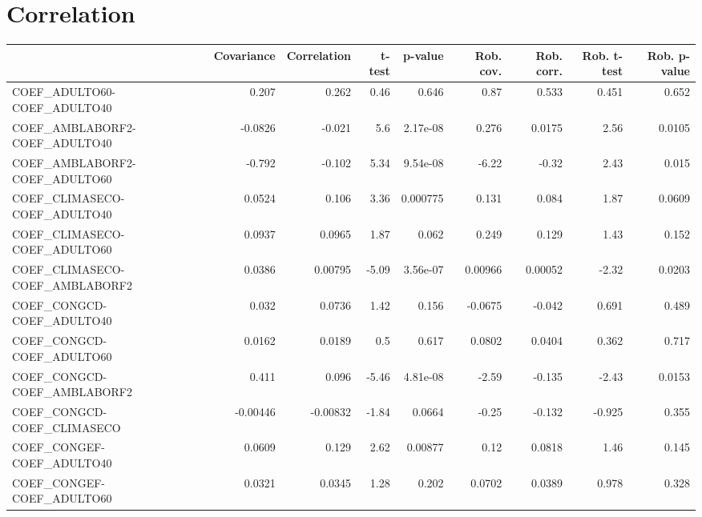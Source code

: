 \section{Correlation}
\begin{tabular}{lrrrrrrrr}
\toprule
{} &  Covariance &  Correlation &   t-test &  p-value &  Rob. cov. &  Rob. corr. &  Rob. t-test &  Rob. p-value \\
\midrule
COEF\_ADULTO60-COEF\_ADULTO40           &       0.207 &        0.262 &     0.46 &    0.646 &       0.87 &       0.533 &        0.451 &         0.652 \\
COEF\_AMBLABORF2-COEF\_ADULTO40         &     -0.0826 &       -0.021 &      5.6 & 2.17e-08 &      0.276 &      0.0175 &         2.56 &        0.0105 \\
COEF\_AMBLABORF2-COEF\_ADULTO60         &      -0.792 &       -0.102 &     5.34 & 9.54e-08 &      -6.22 &       -0.32 &         2.43 &         0.015 \\
COEF\_CLIMASECO-COEF\_ADULTO40          &      0.0524 &        0.106 &     3.36 & 0.000775 &      0.131 &       0.084 &         1.87 &        0.0609 \\
COEF\_CLIMASECO-COEF\_ADULTO60          &      0.0937 &       0.0965 &     1.87 &    0.062 &      0.249 &       0.129 &         1.43 &         0.152 \\
COEF\_CLIMASECO-COEF\_AMBLABORF2        &      0.0386 &      0.00795 &    -5.09 & 3.56e-07 &    0.00966 &     0.00052 &        -2.32 &        0.0203 \\
COEF\_CONGCD-COEF\_ADULTO40             &       0.032 &       0.0736 &     1.42 &    0.156 &    -0.0675 &      -0.042 &        0.691 &         0.489 \\
COEF\_CONGCD-COEF\_ADULTO60             &      0.0162 &       0.0189 &      0.5 &    0.617 &     0.0802 &      0.0404 &        0.362 &         0.717 \\
COEF\_CONGCD-COEF\_AMBLABORF2           &       0.411 &        0.096 &    -5.46 & 4.81e-08 &      -2.59 &      -0.135 &        -2.43 &        0.0153 \\
COEF\_CONGCD-COEF\_CLIMASECO            &    -0.00446 &     -0.00832 &    -1.84 &   0.0664 &      -0.25 &      -0.132 &       -0.925 &         0.355 \\
COEF\_CONGEF-COEF\_ADULTO40             &      0.0609 &        0.129 &     2.62 &  0.00877 &       0.12 &      0.0818 &         1.46 &         0.145 \\
COEF\_CONGEF-COEF\_ADULTO60             &      0.0321 &       0.0345 &     1.28 &    0.202 &     0.0702 &      0.0389 &        0.978 &         0.328 \\

\end{tabular}
